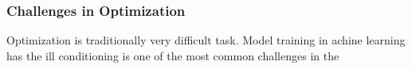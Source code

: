 \subsubsection{Challenges in Optimization}

Optimization is traditionally very difficult task. Model training in achine learning has 
the ill conditioning is one of the most common challenges in the 